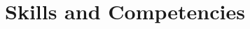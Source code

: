 \documentclass[10pt,a4paper,svgnames]{article}
\newcommand{\sepa}{$\cdot$~}
\newcommand{\role}[1]{\textbf{#1}}
\newcommand{\montant}{\rule{0pt}{.5cm}}
\begin{document}
\begin{tabular}{p{.065\linewidth} p{0.45\linewidth} p{0.415\linewidth}}


\end{tabular}

\section*{Skills and Competencies}
\end{document}
